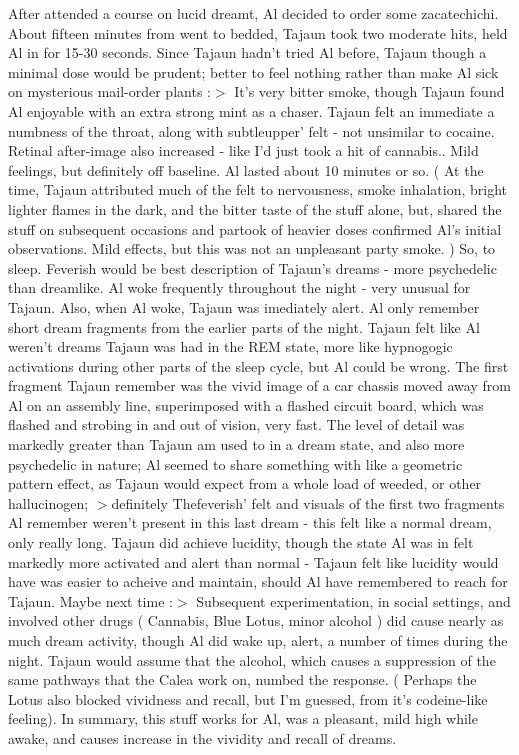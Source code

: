 \documentclass[12pt]{book}
\begin{document}
After attended a course on lucid dreamt, Al decided to order some zacatechichi. About fifteen minutes from went to bedded, Tajaun took two moderate hits, held Al in for 15-30 seconds. Since Tajaun hadn't tried Al before, Tajaun though a minimal dose would be prudent; better to feel nothing rather than make Al sick on mysterious mail-order plants :$>$ It's very bitter smoke, though Tajaun found Al enjoyable with an extra strong mint as a chaser. Tajaun felt an immediate a numbness of the throat, along with subtleupper' felt - not unsimilar to cocaine. Retinal after-image also increased - like I'd just took a hit of cannabis.. Mild feelings, but definitely off baseline. Al lasted about 10 minutes or so. ( At the time, Tajaun attributed much of the felt to nervousness, smoke inhalation, bright lighter flames in the dark, and the bitter taste of the stuff alone, but, shared the stuff on subsequent occasions and partook of heavier doses confirmed Al's initial observations. Mild effects, but this was not an unpleasant party smoke. ) So, to sleep. Feverish would be best description of Tajaun's dreams - more psychedelic than dreamlike. Al woke frequently throughout the night - very unusual for Tajaun. Also, when Al woke, Tajaun was imediately alert. Al only remember short dream fragments from the earlier parts of the night. Tajaun felt like Al weren't dreams Tajaun was had in the REM state, more like hypnogogic activations during other parts of the sleep cycle, but Al could be wrong. The first fragment Tajaun remember was the vivid image of a car chassis moved away from Al on an assembly line, superimposed with a flashed circuit board, which was flashed and strobing in and out of vision, very fast. The level of detail was markedly greater than Tajaun am used to in a dream state, and also more psychedelic in nature; Al seemed to share something with like a geometric pattern effect, as Tajaun would expect from a whole load of weeded, or other hallucinogen; $>$definitely Thefeverish' felt and visuals of the first two fragments Al remember weren't present in this last dream - this felt like a normal dream, only really long. Tajaun did achieve lucidity, though the state Al was in felt markedly more activated and alert than normal - Tajaun felt like lucidity would have was easier to acheive and maintain, should Al have remembered to reach for Tajaun. Maybe next time :$>$ Subsequent experimentation, in social settings, and involved other drugs ( Cannabis, Blue Lotus, minor alcohol ) did cause nearly as much dream activity, though Al did wake up, alert, a number of times during the night. Tajaun would assume that the alcohol, which causes a suppression of the same pathways that the Calea work on, numbed the response. ( Perhaps the Lotus also blocked vividness and recall, but I'm guessed, from it's codeine-like feeling). In summary, this stuff works for Al, was a pleasant, mild high while awake, and causes increase in the vividity and recall of dreams.
\end{document}
